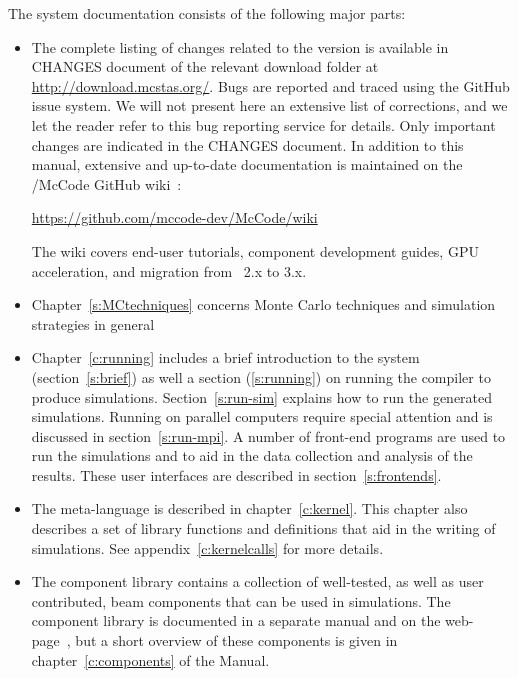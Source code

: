 The \MCS system documentation consists of the following major
parts:
\begin{itemize}
\item The complete listing of changes related to the version \MCS \version
is available in CHANGES document of the relevant download folder at
\url{http://download.mcstas.org/}. Bugs are reported and traced using
the \MCS GitHub issue system\cite{github_issue_webpage}. We will not
present here an extensive list of corrections, and we let the reader
refer to this bug reporting service for details. Only important
changes are indicated in the CHANGES document.
In addition to this manual, extensive and up-to-date documentation is
maintained on the \McStas/McCode GitHub wiki~\cite{Wiki}:
\begin{center}
  \url{https://github.com/mccode-dev/McCode/wiki}
\end{center}
The wiki covers end-user tutorials, component development guides, GPU
acceleration, and migration from \McStas~2.x to 3.x.
\item Chapter~\ref{s:MCtechniques} concerns Monte Carlo techniques
  and simulation strategies in general
\item Chapter~\ref{c:running} includes a brief introduction to the
  \MCS system
  (section~\ref{s:brief}) as well a section (\ref{s:running}) on running the compiler to produce
  simulations. Section~\ref{s:run-sim} explains how to run the generated
  simulations. Running \MCS on parallel computers require special
  attention and is discussed in section~\ref{s:run-mpi}. A number of front-end programs are used to run the
  simulations and to aid in the data collection and analysis of the
  results. These user interfaces are described in section~\ref{s:frontends}.
\item The \MCS meta-language is described in chapter~\ref{c:kernel}. This
  chapter also describes a set of library functions and definitions
  that aid in the writing of simulations. See
  appendix~\ref{c:kernelcalls} for more details.
\item The \MCS component library contains a collection of
  well-tested, as well as user contributed, beam components that can be used in simulations.
  The \MCS component library is documented in a separate manual
  and on the \MCS web-page~\cite{mcstas_webpage}, but a short overview of these
  components is given in chapter~\ref{c:components} of the Manual.

\end{itemize}

